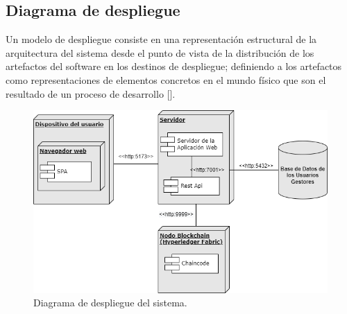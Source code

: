 %

\subsection{Diagrama de despliegue}
Un modelo de despliegue consiste en una representación estructural de la arquitectura del sistema desde el punto de vista de la distribución de los artefactos del software en los destinos de despliegue; definiendo a los artefactos como representaciones de elementos concretos en el mundo físico que son el resultado de un proceso de desarrollo [\cite{91}]. 

\begin{figure}[htbp]
\centering
\includegraphics[scale=0.65]{Graphics/deploy}
\caption{Diagrama de despliegue del sistema.}
\label{fig:deploy}
\end{figure}


